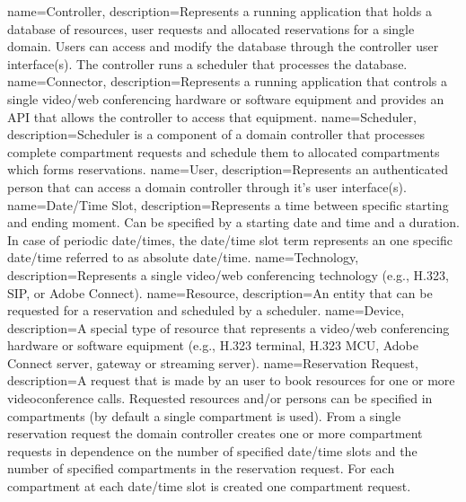 {
  name=Controller,
  description={Represents a running application that holds a database of 
    resources, user requests and allocated reservations for a single 
    domain. Users can access and modify the database through the controller 
    user interface(s). The controller runs a scheduler that processes the 
    database.}
}
{
  name=Connector,
  description={Represents a running application that controls a single 
    video/web conferencing hardware or software equipment and provides an API 
    that allows the controller to access that equipment.}
}
{
  name=Scheduler,
  description={Scheduler is a component of a domain controller that processes 
    complete compartment requests and schedule them to allocated compartments 
    which forms reservations.}
}
{
  name=User,
  description={Represents an authenticated person that can access a domain 
    controller through it's user interface(s).}
}
{
  name=Date/Time Slot,
  description={Represents a time between specific starting and ending moment. 
    Can be specified by a starting date and time and a duration. In case of
    periodic date/times, the date/time slot term represents an one specific 
    date/time referred to as absolute date/time.}
}
{
  name=Technology,
  description={Represents a single video/web conferencing technology (e.g., 
    H.323, SIP, or Adobe Connect).}
}
{
  name=Resource,
  description={An entity that can be requested for a reservation and scheduled 
  by a scheduler.}
}
{
  name=Device,
  description={A special type of resource that represents a video/web 
    conferencing hardware or software equipment (e.g., H.323 terminal, H.323 
    MCU, Adobe Connect server, gateway or streaming server).}
}
{
  name=Reservation Request,
  description={A request that is made by an user to book resources for one or 
    more videoconference calls. Requested resources and/or persons can be 
    specified in compartments (by default a single compartment is used). 
    From a single reservation request the domain controller creates 
    one or more compartment requests in dependence on the 
    number of specified date/time slots and the number of specified 
    compartments in the reservation request. For each compartment at each 
    date/time slot is created one compartment request.}
}
